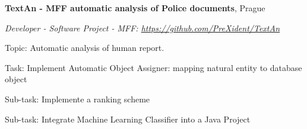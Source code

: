 \documentclass[9pt]{extreport}
\renewcommand{\section}[2]%
        {\pagebreak[2]\vspace{0.8\baselineskip}%
         \hspace{0in}%
         \marginpar{
         \raggedright \emph{#1}}#2}
\newenvironment{innerlist}[1][\enskip\textbullet]%
        {\vspace{0.2\baselineskip}\begin{compactitem}[#1]}{\end{compactitem}}
\begin{document}
\section{2013-2014}
%
\textbf{TextAn - MFF automatic analysis of Police documents}, Prague

\begin{innerlist}

\item[] \textit{Developer - Software Project - MFF:  \href{https://github.com/PreXident/TextAn}{https://github.com/PreXident/TextAn}} 
 	\begin{innerlist}
     \item Topic: Automatic analysis of human report.
     \item Task: Implement Automatic Object Assigner: mapping natural entity to database object
     \item Sub-task: Implemente a ranking scheme
     \item Sub-task: Integrate Machine Learning Classifier into a Java Project
    \end{innerlist}
\end{innerlist}
\end{document}
